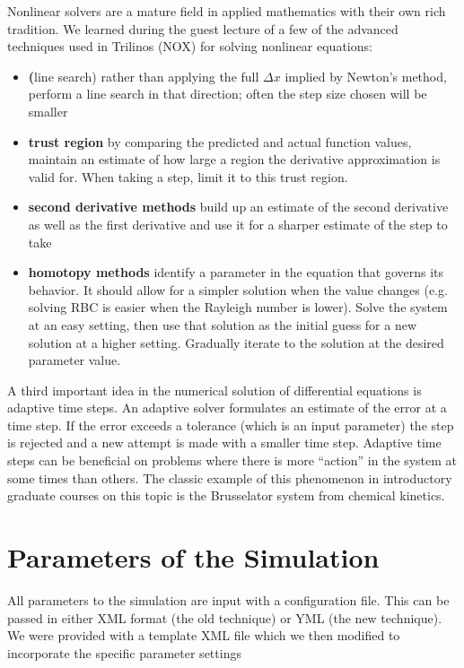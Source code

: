 \documentclass[11pt]{article} %
\begin{document}
Nonlinear solvers are a mature field in applied mathematics with their own rich tradition.
We learned during the guest lecture of a few of the advanced techniques 
used in Trilinos (NOX) for solving nonlinear equations:
\begin{itemize}
\item{\textbf(line search)} rather than applying the full $\Delta x$ implied by Newton's method,
perform a line search in that direction; often the step size chosen will be smaller
\item{\textbf{trust region}} by comparing the predicted and actual function values,
maintain an estimate of how large a region the derivative approximation is valid
for.  When taking a step, limit it to this trust region.
\item{\textbf{second derivative methods}} build up an estimate of the second derivative as well
as the first derivative and use it for a sharper estimate of the step to take
\item{\textbf{homotopy methods}} identify a parameter in the equation that governs its behavior.
It should allow for a simpler solution when the value changes 
(e.g. solving RBC is easier when the Rayleigh number is lower).
Solve the system at an easy setting, then use that solution as the initial guess
 for a new solution at a higher setting.  Gradually iterate to the solution at
 the desired parameter value.
\end{itemize}

A third important idea in the numerical solution of differential equations is adaptive time steps.
An adaptive solver formulates an estimate of the error at a time step.  
If the error exceeds a tolerance (which is an input parameter) the step is rejected and 
a new attempt is made with a smaller time step.
Adaptive time steps can be beneficial on problems where there is more ``action'' in the
system at some times than others.  
The classic example of this phenomenon in introductory graduate courses on this
topic is the Brusselator system from chemical kinetics.

\section{Parameters of the Simulation}
All parameters to the simulation are input with a configuration file.
This can be passed in either XML format (the old technique) or YML (the new technique).
We were provided with a template XML file which we then modified to incorporate the 
specific parameter settings 
\end{document}
